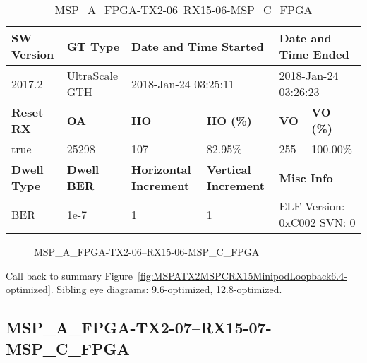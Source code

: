 \begin{table}[h]
\centering
\caption{MSP\_A\_FPGA-TX2-06--RX15-06-MSP\_C\_FPGA}
\label{tab:MSPAFPGATX206RX1506MSPCFPGA6.4-optimized}
\begin{tabular}{@{}|l|l|l|l|l|l|@{}}
\toprule
\textbf{SW Version}                & \textbf{GT Type}   & \multicolumn{2}{l|}{\textbf{Date and Time Started}}            & \multicolumn{2}{l|}{\textbf{Date and Time Ended}}        \\ \midrule
2017.2                       & UltraScale GTH          & \multicolumn{2}{l|}{2018-Jan-24 03:25:11}                   & \multicolumn{2}{l|}{2018-Jan-24 03:26:23}               \\ \midrule
\textbf{Reset RX}                  & \textbf{OA} & \textbf{HO}   & \textbf{HO (\%)} & \textbf{VO} & \textbf{VO (\%)} \\ \midrule
true & 25298        & 107          & 82.95\%        & 255        & 100.00\%       \\ \midrule
\textbf{Dwell Type}                & \textbf{Dwell BER} & \textbf{Horizontal Increment} & \textbf{Vertical Increment}    & \multicolumn{2}{l|}{\textbf{Misc Info}}                  \\ \midrule
BER                            & 1e-7        & 1        & 1           & \multicolumn{2}{l|}{ELF Version: 0xC002 SVN: 0}                         \\ \bottomrule
\end{tabular}
\end{table}

\begin{figure}[h]
\caption{MSP\_A\_FPGA-TX2-06--RX15-06-MSP\_C\_FPGA} \label{fig:MSPAFPGATX206RX1506MSPCFPGA6.4-optimized}
\end{figure}

Call back to summary Figure~\ref{fig:MSPATX2MSPCRX15MinipodLoopback6.4-optimized}.
Sibling eye diagrams: \hyperref[sec:MSPAFPGATX206RX1506MSPCFPGA9.6-optimized]{9.6-optimized}, \hyperref[sec:MSPAFPGATX206RX1506MSPCFPGA12.8-optimized]{12.8-optimized}.

\clearpage
\newpage


\subsection{MSP\_A\_FPGA-TX2-07--RX15-07-MSP\_C\_FPGA}\label{sec:MSPAFPGATX207RX1507MSPCFPGA6.4-optimized}


